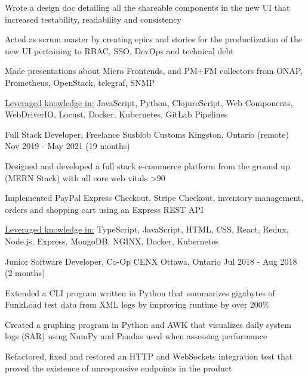 \begin{cventries}
{\begin{cvitems}
			\item{Wrote a design doc detailing all the shareable components in the new UI that increased testability, readability and consistency}
			\item{Acted as scrum master by creating epics and stories for the productization of the new UI pertaining to RBAC, SSO, DevOps and technical debt}
			\item{Made presentations about Micro Frontends, and PM+FM collectors from ONAP, Prometheus, OpenStack, telegraf, SNMP}
			\item{\underline{Leveraged knowledge in:} JavaScript, Python, ClojureScript, Web Components, WebDriverIO, Locust, Docker, Kubernetes, GitLab Pipelines}
		\end{cvitems}
	}
	\cventry
	{Full Stack Developer, Freelance}
	{Susblob Customs}
	{Kingston, Ontario (remote)}
	{Nov 2019 - May 2021 (19 months)}
	{
		\begin{cvitems}
			\item{Designed and developed a full stack e-commerce platform from the ground up (MERN Stack) with all core web vitals >90}
			\item{Implemented PayPal Express Checkout, Stripe Checkout, inventory management, orders and shopping cart using an Express REST API}
			\item{\underline{Leveraged knowledge in:} TypeScript, JavaScript, HTML, CSS, React, Redux, Node.js, Express, MongoDB, NGINX, Docker, Kubernetes}
		\end{cvitems}
	}
	\cventry
	{Junior Software Developer, Co-Op}
	{CENX}
	{Ottawa, Ontario}
	{Jul 2018 - Aug 2018 (2 months)}
	{
		\begin{cvitems}
			\item{Extended a CLI program written in Python that summarizes gigabytes of FunkLoad test data from XML logs by improving runtime by over 200\%}
			\item{Created a graphing program in Python and AWK that visualizes daily system logs (SAR) using NumPy and Pandas used when assessing performance}
			\item{Refactored, fixed and restored an HTTP and WebSockets integration test that proved the existence of unresponsive endpoints in the product}
		\end{cvitems}
	}
\end{cventries}
